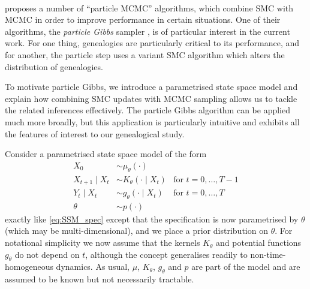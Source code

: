 
\\


\textcite{andrieu2010} proposes a number of ``particle MCMC'' algorithms, which combine SMC with MCMC in order to improve performance in certain situations.
One of their algorithms, the \emph{particle Gibbs} sampler \parencite[Section 2.4.3]{andrieu2010}, is of particular interest in the current work. For one thing, genealogies are particularly critical to its performance, and for another, the particle step uses a variant SMC algorithm which alters the distribution of genealogies.

To motivate particle Gibbs, we introduce a parametrised state space model and explain how combining SMC updates with MCMC sampling allows us to tackle the related inferences effectively.
The particle Gibbs algorithm can be applied much more broadly, but this application is particularly intuitive and exhibits all the features of interest to our genealogical study.


Consider a parametrised state space model of the form
\begin{align*}
X_0 &\sim \mu_\theta(\cdot) & \\
X_{t+1} \mid X_{t} &\sim K_\theta(\cdot \mid X_{t}) &\text{for } t=0,\dots, T-1 \\
Y_t \mid X_t &\sim g_\theta(\cdot \mid X_t) &\text{for } t=0,\dots, T \\
\theta &\sim p(\cdot) &
\end{align*}
exactly like \eqref{eq:SSM_spec} except that the specification is now parametrised by $\theta$ (which may be multi-dimensional), and we place a prior distribution on $\theta$. 
For notational simplicity we now assume that the kernels $K_\theta$ and potential functions $g_\theta$ do not depend on $t$, although the concept generalises readily to non-time-homogeneous dynamics.
As usual, $\mu$, $K_\theta$, $g_\theta$ and $p$ are part of the model and are assumed to be known but not necessarily tractable.

